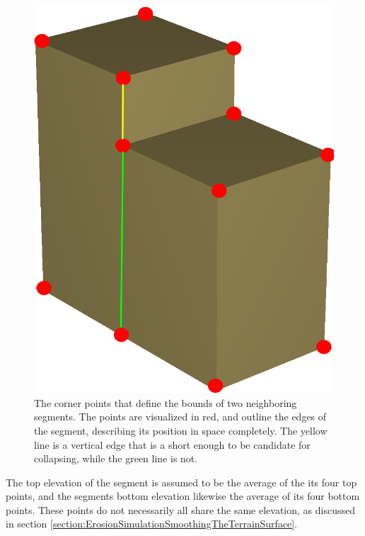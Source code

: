 \begin{figure}[t]
\centering
\begin{minipage}[b]{0.6\linewidth}
\begin{center}
\includegraphics[width=\textwidth]{images/TetraMesh_SolidShell_EdgeExample.png}
\end{center}
\end{minipage}
\caption[Example of segment edges and corner points]
{\label{figure:SegmentEdgesAndCornerPoints} The corner points that define the bounds of two neighboring segments. The points are visualized in red, and outline the edges of the segment, describing its position in space completely. The yellow line is a vertical edge that is a short enough to be candidate for collapsing, while the green line is not. }
\end{figure}

The top elevation of the segment is assumed to be the average of the its four top points, and the segments bottom elevation likewise the average of its four bottom points. These points do not necessarily all share the same elevation, as discussed in section \ref{section:ErosionSimulationSmoothingTheTerrainSurface}.



